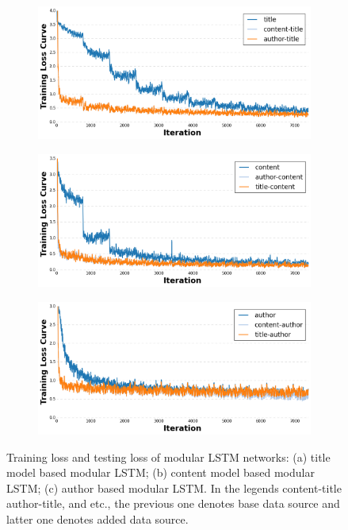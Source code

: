 \documentclass[12pt]{article}
\begin{document}
\begin{figure}[!t]
\begin{subfigure}{1\textwidth}
  \centering
   \includegraphics[width=4in]{figures/loss_training_title_modular.png}
   \caption{}
   \label{modular_loss_title}
\end{subfigure}

\begin{subfigure}{1\textwidth}
  \centering
   \includegraphics[width=4in]{figures/loss_training_content_modular.png}
   \caption{}
   \label{modular_loss_title}
\end{subfigure}

\begin{subfigure}{1\textwidth}
  \centering
   \includegraphics[width=4in]{figures/loss_training_author_modular.png}
   \caption{}
   \label{modular_loss_title}
\end{subfigure}

\caption{Training loss and testing loss of modular LSTM networks: (a) title model based modular LSTM; (b) content model based modular LSTM; (c) author based modular LSTM. In the legends content-title author-title, and etc., the previous one denotes base data source and latter one denotes added data source.}
\label{modular_loss}
\end{figure}
\end{document}
